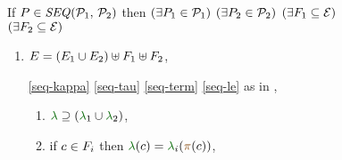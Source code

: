 \begin{figure}
  \renewcommand{\phEvs}{F}
  \raggedright
  
  \noindent
  If $\aPS \in \sSEMI{\aPSS_1}{\aPSS_2}$ then
  $(\exists P_1\in\mathcal{P}_1)$ $(\exists P_2\in\mathcal{P}_2)$
  $(\exists\phEvs_1\subseteq\AllEvents)$ $(\exists\phEvs_2\subseteq\AllEvents)$
  \begin{multicols}{2}
    \begin{enumerate}[topsep=0pt,label=(\textsc{s}\arabic*),ref=\textsc{s}\arabic*]
      \setcounter{enumi}{\value{BE}}
    \item \label{seq-E-phantom}
      $\aEvs=(\aEvs_1\cup\aEvs_2)\uplus\phEvs_1 \uplus\phEvs_2$,

    \item[\eqref{seq-kappa}]
      \eqref{seq-tau}\;
      \eqref{seq-term}\;
      \eqref{seq-le}\;
      as in ,

      \setcounter{enumi}{\value{lambda}}
    \item[] 
      \begin{enumerate}[leftmargin=0pt]
      \item \label{seq-lambda-include}
        ${\labeling}\supseteq\PBR{{\labeling_1}\cup {\labeling_2}}$, 
      \item \label{seq-lambda-phantom}
        if $\cEv\in \phEvs_i$ then $\labeling(\cEv)=\labeling_i(\fmrg{\cEv})$,
      \end{enumerate}



\end{enumerate}
\end{multicols}
\end{figure}
